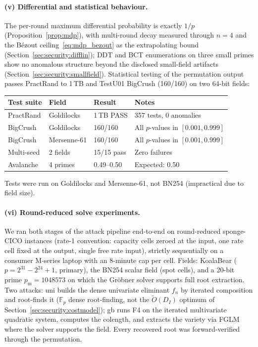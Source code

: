 \documentclass[11pt,a4paper]{article}
\theoremstyle{definition}
\newcommand{\F}{\mathbb{F}}
\begin{document}
\paragraph{(v) Differential and statistical behaviour.}
The per-round maximum differential probability is exactly $1/p$
(Proposition~\ref{prop:mdp}), with multi-round decay measured through
$n = 4$ and the B\'ezout ceiling~\eqref{eq:mdp_bezout} as the
extrapolating bound (Section~\ref{sec:security:difflin}); DDT and
BCT enumerations on three small primes show no anomalous structure
beyond the disclosed small-field artifacts
(Section~\ref{sec:security:smallfield}). Statistical testing of the
permutation output passes PractRand to 1\,TB and TestU01 BigCrush
(160/160) on two 64-bit fields:

\begin{center}
\small
\begin{tabular}{@{}llll@{}}
\toprule
Test suite & Field & Result & Notes \\
\midrule
PractRand  & Goldilocks & 1\,TB PASS & 357 tests, 0 anomalies \\
BigCrush   & Goldilocks & 160/160 & All $p$-values in $[0.001, 0.999]$ \\
BigCrush   & Mersenne-61 & 160/160 & All $p$-values in $[0.001, 0.999]$ \\
Multi-seed & 2 fields & 15/15 pass & Zero failures \\
Avalanche  & 4 primes & 0.49--0.50 & Expected: 0.50 \\
\bottomrule
\end{tabular}
\end{center}
\smallskip

\noindent
Tests were run on Goldilocks and Mersenne-61, not BN254 (impractical
due to field size).

\paragraph{(vi) Round-reduced solve experiments.}
We ran both stages of the attack pipeline end-to-end on
round-reduced sponge-CICO instances (rate-1 convention: capacity
cells zeroed at the input, one rate cell fixed at the output, single
free rate input), strictly sequentially on a consumer M-series
laptop with an 8-minute cap per cell. Fields: KoalaBear
($p = 2^{31} - 2^{24} + 1$, primary), the BN254 scalar field (spot
cells), and a 20-bit prime $p_{\mathrm{m}} = 1048573$ on which the
Gr\"obner solver supports full root extraction. Two attacks:
\textsf{uni} builds the dense univariate eliminant $f_n$ by iterated
composition and root-finds it ($\F_p$ dense root-finding, not the
$\widetilde{O}(D_I)$ optimum of
Section~\ref{sec:security:costmodel}); \textsf{gb} runs F4 on the
iterated multivariate quadratic system, computes the colength, and
extracts the variety via FGLM where the solver supports the field.
Every recovered root was forward-verified through the permutation.
\end{document}
